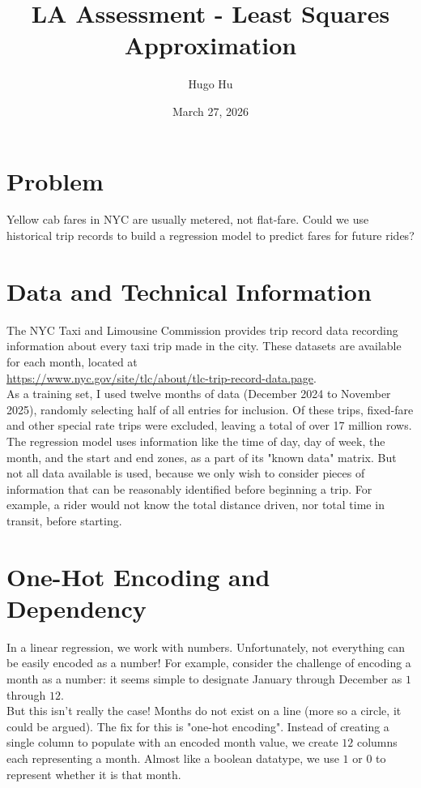 \documentclass[12pt]{article}
\date{March 27, 2026}
\title{%
  LA Assessment - Least Squares Approximation 
}
\author{Hugo Hu}
\begin{document}
\maketitle

\section*{Problem}

Yellow cab fares in NYC are usually metered, not flat-fare. Could we use historical trip records to build a regression
model to predict fares for future rides?

\section*{Data and Technical Information}
The NYC Taxi and Limousine Commission provides trip record data recording information about every taxi trip made in the city. These datasets are available for each month, located 
at\\ \url{https://www.nyc.gov/site/tlc/about/tlc-trip-record-data.page}. \\

As a training set, I used twelve months of data (December 2024 to November 2025), randomly selecting half of all entries for inclusion. Of these trips, 
fixed-fare and other special rate trips were excluded, leaving a total of over 17 million rows. \\

The regression model uses information like the time of day, day of week, the month, and the start and end zones, as a part of its "known data" matrix. 
But not all data available is used, because we only wish to consider pieces of information that can be reasonably identified before beginning a trip. For example,
a rider would not know the total distance driven, nor total time in transit, before starting. 
\\

\newpage
\section*{One-Hot Encoding and Dependency}
In a linear regression, we work with numbers. Unfortunately, not everything can be easily encoded as a number! For example, consider the challenge of encoding
a month as a number: it seems simple to designate January through December as $1$ through $12$.\\

But this isn't really the case! Months do not exist on a line (more so a circle, it could be argued). The fix for this is "one-hot encoding". Instead of creating
a single column to populate with an encoded month value, we create $12$ columns each representing a month. Almost like a boolean datatype, we use $1$ or $0$ to 
represent whether it is that month. \\
\end{document}
